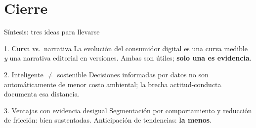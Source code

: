 \documentclass[aspectratio=169,xcolor=dvipsnames]{beamer}
\begin{document}
\section{Cierre}

\begin{frame}{Síntesis: tres ideas para llevarse}
\begin{block}{1. Curva vs.\ narrativa}
  \small La evolución del consumidor digital es una curva medible \emph{y} una narrativa editorial en versiones. Ambas son útiles; \textbf{solo una es evidencia}.
\end{block}
\begin{block}{2. Inteligente $\neq$ sostenible}
  \small Decisiones informadas por datos no son automáticamente de menor costo ambiental; la brecha actitud-conducta documenta esa distancia.
\end{block}
\begin{block}{3. Ventajas con evidencia desigual}
  \small Segmentación por comportamiento y reducción de fricción: bien sustentadas. Anticipación de tendencias: \textbf{la menos}.
\end{block}
\end{frame}
\end{document}
